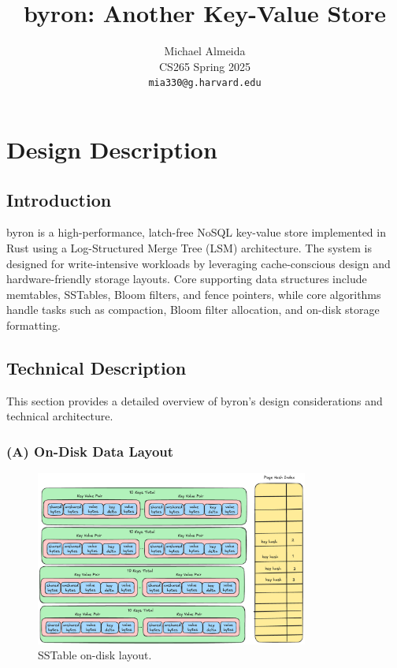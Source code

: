 \documentclass[10pt]{article}
\title{\bfseries byron: Another Key-Value Store}
\author{%
  Michael Almeida\\
  \small CS265 Spring 2025\\
  \texttt{mia330@g.harvard.edu}%
}
\date{} %
\begin{document}
\maketitle

\section{Design Description}

\subsection{Introduction}
byron is a high-performance, latch-free NoSQL key-value store implemented in Rust using a Log-Structured Merge Tree (LSM) architecture. The system is designed for write-intensive workloads by leveraging cache-conscious design and hardware-friendly storage layouts. Core supporting data structures include memtables, SSTables, Bloom filters, and fence pointers, while core algorithms handle tasks such as compaction, Bloom filter allocation, and on-disk storage formatting.

\subsection{Technical Description}
This section provides a detailed overview of byron’s design considerations and technical architecture.

\subsubsection*{(A) On-Disk Data Layout}
\begin{figure}[htbp]
  \centering
  \includegraphics[width=0.8\textwidth]{sstable_full.png}
  \caption{SSTable on-disk layout.}\label{fig:SSTable}
\end{figure}
\end{document}
